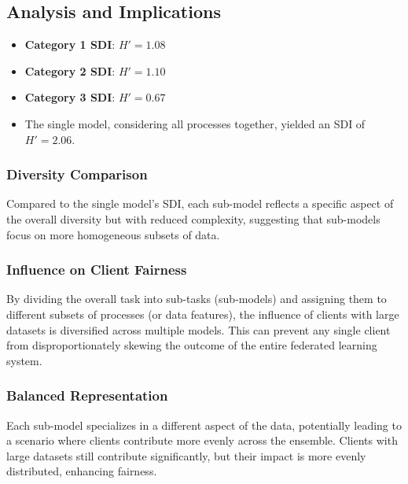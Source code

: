 \subsection*{Analysis and Implications}

\begin{itemize}
    \item \textbf{Category 1 SDI}: $H' = 1.08$
    \item \textbf{Category 2 SDI}: $H' = 1.10$
    \item \textbf{Category 3 SDI}: $H' = 0.67$
    \item The single  model, considering all processes together, yielded an SDI of $H' = 2.06$.
\end{itemize}

\subsubsection*{Diversity Comparison}

Compared to the single  model's SDI, each sub-model reflects a specific aspect of the overall diversity but with reduced complexity, suggesting that sub-models focus on more homogeneous subsets of data.

\subsubsection*{Influence on Client Fairness}

By dividing the overall task into sub-tasks (sub-models) and assigning them to different subsets of processes (or data features), the influence of clients with large datasets is diversified across multiple models. This can prevent any single client from disproportionately skewing the outcome of the entire federated learning system.

\subsubsection*{Balanced Representation}

Each sub-model specializes in a different aspect of the data, potentially leading to a scenario where clients contribute more evenly across the ensemble. Clients with large datasets still contribute significantly, but their impact is more evenly distributed, enhancing fairness.

